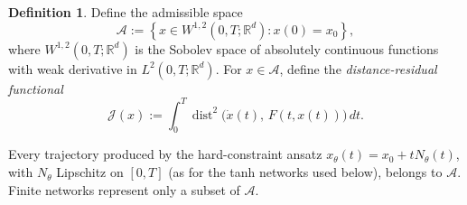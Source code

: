 \documentclass[11pt]{elsarticle}
\theoremstyle{definition}
\newtheorem{definition}[theorem]{Definition}
\theoremstyle{remark}
\numberwithin{equation}{section}
\def\dist{\operatorname{dist}}
\begin{document}
	\begin{definition}\label{def:admissible-class}
		Define the admissible space
		\[
		\mathcal{A}:= \left\{ x \in W^{1,2}(0,T; \mathbb{R}^d) : x(0) = x_0 \right\},
		\]
		where $W^{1,2}(0,T; \mathbb{R}^d)$ is the Sobolev space of absolutely 
		continuous functions with weak derivative in $L^2(0,T; \mathbb{R}^d)$.
		For $x\in\mathcal{A}$, define the \emph{distance-residual functional}
		\begin{equation}\label{eq:cont-functional}
			\mathcal{J}(x)
			:=
			\int_0^T\dist^2\bigl(\dot{x}(t),\,F(t,x(t))\bigr)\,dt.
		\end{equation}
	\end{definition}
	
	Every trajectory produced by the hard-constraint ansatz
	$x_\theta(t)=x_0+tN_\theta(t)$, with $N_\theta$ Lipschitz on $[0,T]$
	(as for the tanh networks used below), belongs to $\mathcal{A}$. Finite
	networks represent only a subset of $\mathcal{A}$.
	
\end{document}
